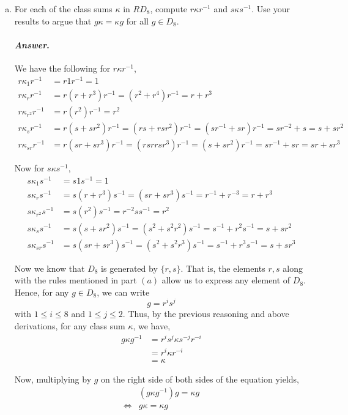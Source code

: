 \documentclass[11pt, reqno]{amsart}
\theoremstyle{plain}
\theoremstyle{definition}
\theoremstyle{example}
\newenvironment{ans}{\medskip \paragraph*{\emph{Answer}.}}{\hfill \break  $~\!\!$ \dotfill \medskip }
\begin{document}
\begin{enumerate}[1.]
\begin{enumerate}[(a)]
\item For each of the class sums $\kappa$ in $RD_8$, compute $r\kappa r^{-1}$ and $s \kappa s^{-1}$. Use your results to argue that $g \kappa = \kappa g$ for all $g \in D_8$. 

\begin{ans}
We have the following for $r \kappa r^{-1}$,
\begin{align*}
r\kappa_1r^{-1} &= r1r^{-1} = 1\\
r\kappa_rr^{-1} &= r(r + r^3)r^{-1} = (r^2 + r^4)r^{-1} = r + r^3\\
r\kappa_{r^2}r^{-1} &= r(r^2)r^{-1} = r^2\\
r\kappa_{s}r^{-1} &= r(s + sr^2)r^{-1} = (rs + rsr^2)r^{-1} = (sr^{-1} + sr)r^{-1} = sr^{-2} + s = s + sr^2\\
r\kappa_{sr}r^{-1} &= r(sr + sr^3)r^{-1} = (rsr rsr^3)r^{-1} = (s + sr^2)r^{-1} = sr^{-1} + sr = sr + sr^{3}
\end{align*}

Now for $s \kappa s^{-1}$,
\begin{align*}
s\kappa_1s^{-1} &= s1s^{-1} = 1\\
s\kappa_rs^{-1} &= s(r + r^3)s^{-1} = (sr + sr^3)s^{-1} = r^{-1} + r^{-3} = r + r^3\\
s\kappa_{r^2}s^{-1} &= s(r^2)s^{-1} = r^{-2}ss^{-1} = r^2\\
s\kappa_{s}s^{-1} &= s(s + sr^2)s^{-1} = (s^2 + s^2r^2)s^{-1} = s^{-1} + r^2s^{-1} = s + sr^2\\
s\kappa_{sr}s^{-1} &= s(sr + sr^3)s^{-1} = (s^2 + s^2r^3)s^{-1} = s^{-1} + r^{3}s^{-1} = s + sr^3
\end{align*}

Now we know that $D_8$ is generated by $\{r, s\}$. That is, the elements $r, s$ along with the rules mentioned in part $(a)$ allow us to express any element of $D_8$. Hence, for any $g \in D_8$, we can write $$g = r^is^j$$ with $1 \leq i \leq 8$ and $1 \leq j \leq 2$. Thus, by the previous reasoning and above derivations, for any class sum $\kappa$, we have,
\begin{align*}
g\kappa g^{-1} &= r^is^j\kappa s^{-j}r^{-i}\\
&= r^i \kappa r^{-i}\\
&= \kappa
\end{align*}

Now, multiplying by $g$ on the right side of both sides of the equation yields,
\begin{align*}
&(g\kappa g^{-1})g = \kappa g\\
\iff & g \kappa = \kappa g
\end{align*}


\end{ans}
\end{enumerate}
\end{enumerate}
\end{document}
